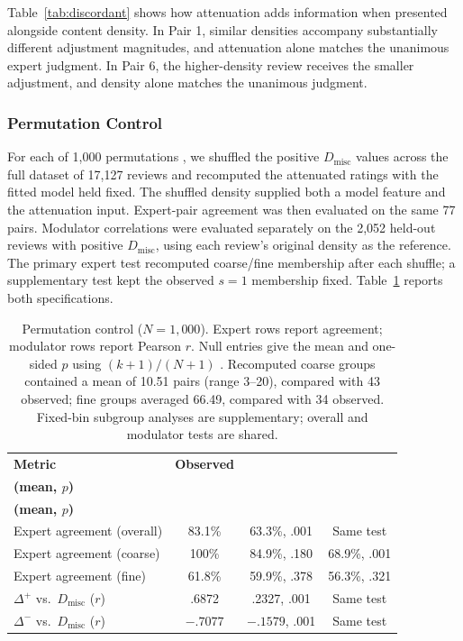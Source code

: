 \documentclass[fleqn,10pt]{JLA_article}
\let\cite\shortcite
\begin{document}
Table~\ref{tab:discordant} shows how attenuation adds information when presented alongside content density. In Pair 1, similar densities accompany substantially different adjustment magnitudes, and attenuation alone matches the unanimous expert judgment. In Pair 6, the higher-density review receives the smaller adjustment, and density alone matches the unanimous judgment.

\subsubsection{Permutation Control}

For each of 1{,}000 permutations \cite{Ernst2004}, we shuffled the positive $D_{\text{misc}}$ values across the full dataset of 17{,}127 reviews and recomputed the attenuated ratings with the fitted model held fixed. The shuffled density supplied both a model feature and the attenuation input. Expert-pair agreement was then evaluated on the same 77 pairs. Modulator correlations were evaluated separately on the 2{,}052 held-out reviews with positive $D_{\text{misc}}$, using each review's original density as the reference. The primary expert test recomputed coarse/fine membership after each shuffle; a supplementary test kept the observed $s=1$ membership fixed. Table~\ref{tab:permutation-control} reports both specifications.

\begin{table}[htbp]
\caption{Permutation control ($N=1{,}000$). Expert rows report agreement; modulator rows report Pearson $r$. Null entries give the mean and one-sided $p$ using $(k+1)/(N+1)$ \protect\cite{PhipsonSmyth2010}. Recomputed coarse groups contained a mean of 10.51 pairs (range 3--20), compared with 43 observed; fine groups averaged 66.49, compared with 34 observed. Fixed-bin subgroup analyses are supplementary; overall and modulator tests are shared.}
\label{tab:permutation-control}
\centering
\small
\setlength{\tabcolsep}{5pt}
\begin{tabular}{lccc}
\toprule
\textbf{Metric} & \textbf{Observed} & \shortstack{\textbf{Recomputed null}\\\textbf{(mean, $p$)}} & \shortstack{\textbf{Fixed-bin null}\\\textbf{(mean, $p$)}} \\
\midrule
Expert agreement (overall) & 83.1\% & 63.3\%, .001 & Same test \\
Expert agreement (coarse) & 100\% & 84.9\%, .180 & 68.9\%, .001 \\
Expert agreement (fine) & 61.8\% & 59.9\%, .378 & 56.3\%, .321 \\
\midrule
$\Delta^{+}$ vs.\ $D_{\text{misc}}$ ($r$) & .6872 & .2327, .001 & Same test \\
$\Delta^{-}$ vs.\ $D_{\text{misc}}$ ($r$) & $-.7077$ & $-.1579$, .001 & Same test \\
\bottomrule
\end{tabular}
\end{table}
\end{document}

